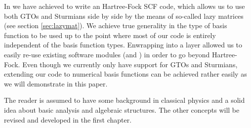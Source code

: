 In \molsturm we have achieved to write an Hartree-Fock SCF code,
which allows us to use both GTOs and Sturmians side by side by the means
of so-called lazy matrices (see section \ref{sec:lazymat}).
We achieve true generality in the type of basis function to be used
up to the point where most of our code is entirely
independent of the basis function types.
Enwrapping \molsturm into a \python layer allowed us to easily re-use existing
software modules (\adcman and \pyscf) in order to go beyond Hartree-Fock.
Even though we currently only have support for GTOs and Sturmians,
extending our code to numerical basis functions can be achieved rather easily
as we will demonstrate in this paper.






The reader is assumed to have some background in classical physics
and a solid idea about basic analysis and algebraic structures.
The other concepts will be revised and developed in the first chapter.
